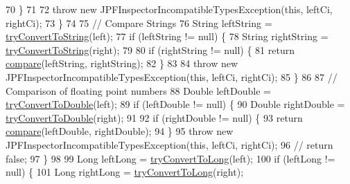 \begin{DoxyCode}
70       \}
71 
72       \textcolor{keywordflow}{throw} \textcolor{keyword}{new} JPFInspectorIncompatibleTypesException(\textcolor{keyword}{this}, leftCi, rightCi);
73     \}
74 
75     \textcolor{comment}{// Compare Strings}
76     String leftString = \hyperlink{classgov_1_1nasa_1_1jpf_1_1inspector_1_1server_1_1programstate_1_1relop_1_1_rel_op_comparable_base_aa1b564784dad5abf5565f080fe1a3a9f}{tryConvertToString}(left);
77     \textcolor{keywordflow}{if} (leftString != null) \{
78       String rightString = \hyperlink{classgov_1_1nasa_1_1jpf_1_1inspector_1_1server_1_1programstate_1_1relop_1_1_rel_op_comparable_base_aa1b564784dad5abf5565f080fe1a3a9f}{tryConvertToString}(right);
79 
80       \textcolor{keywordflow}{if} (rightString != null) \{
81         \textcolor{keywordflow}{return} \hyperlink{classgov_1_1nasa_1_1jpf_1_1inspector_1_1server_1_1programstate_1_1relop_1_1_rel_op_equal_base_a89a8988e7ff80fd175542cf45f5f18d3}{compare}(leftString, rightString);
82       \}
83 
84       \textcolor{keywordflow}{throw} \textcolor{keyword}{new} JPFInspectorIncompatibleTypesException(\textcolor{keyword}{this}, leftCi, rightCi);
85     \}
86 
87     \textcolor{comment}{// Comparison of floating point numbers}
88     Double leftDouble = \hyperlink{classgov_1_1nasa_1_1jpf_1_1inspector_1_1server_1_1programstate_1_1relop_1_1_rel_op_comparable_base_afb31d12a03d2e24581d168c765368a4b}{tryConvertToDouble}(left);
89     \textcolor{keywordflow}{if} (leftDouble != null) \{
90       Double rightDouble = \hyperlink{classgov_1_1nasa_1_1jpf_1_1inspector_1_1server_1_1programstate_1_1relop_1_1_rel_op_comparable_base_afb31d12a03d2e24581d168c765368a4b}{tryConvertToDouble}(right);
91 
92       \textcolor{keywordflow}{if} (rightDouble != null) \{
93         \textcolor{keywordflow}{return} \hyperlink{classgov_1_1nasa_1_1jpf_1_1inspector_1_1server_1_1programstate_1_1relop_1_1_rel_op_equal_base_a89a8988e7ff80fd175542cf45f5f18d3}{compare}(leftDouble, rightDouble);
94       \}
95       \textcolor{keywordflow}{throw} \textcolor{keyword}{new} JPFInspectorIncompatibleTypesException(\textcolor{keyword}{this}, leftCi, rightCi);
96       \textcolor{comment}{// return false;}
97     \}
98 
99     Long leftLong = \hyperlink{classgov_1_1nasa_1_1jpf_1_1inspector_1_1server_1_1programstate_1_1relop_1_1_rel_op_comparable_base_a42b354e4aa57e673f728b1c2c036c69b}{tryConvertToLong}(left);
100     \textcolor{keywordflow}{if} (leftLong != null) \{
101       Long rightLong = \hyperlink{classgov_1_1nasa_1_1jpf_1_1inspector_1_1server_1_1programstate_1_1relop_1_1_rel_op_comparable_base_a42b354e4aa57e673f728b1c2c036c69b}{tryConvertToLong}(right);

\end{DoxyCode}
